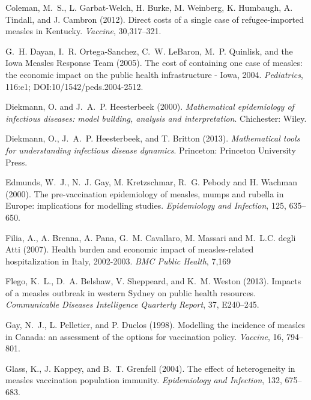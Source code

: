 \documentclass{article}
\begin{document}
\begin{thebibliography}{}
Coleman, M.~S., L. Garbat-Welch, H. Burke, M. Weinberg, K. Humbaugh, A. Tindall, and J. Cambron (2012).
\newblock Direct costs of a single case of refugee-imported measles in Kentucky.
\newblock \emph{Vaccine}, 30,317--321.

G.~H. Dayan, I.~R. Ortega-Sanchez, C.~W. LeBaron, M.~P. Quinlisk, and the Iowa Measles Response Team (2005).
\newblock The cost of containing one case of measles: the economic impact on the public health infrastructure - Iowa, 2004.
\newblock \emph{Pediatrics}, 116:e1; DOI:10/1542/peds.2004-2512.

Diekmann, O. and  J.~A.~P. Heesterbeek (2000).
\newblock \emph{Mathematical epidemiology of infectious diseases: model building, analysis and interpretation}.
Chichester: Wiley.

Diekmann, O.,  J.~A.~P. Heesterbeek, and T. Britton (2013).
\newblock \emph{Mathematical tools for understanding infectious disease dynamics}.
Princeton: Princeton University Press.

Edmunds, W.~J., N.~J. Gay, M. Kretzschmar, R.~G. Pebody and H. Wachman (2000).
\newblock The pre-vaccination epidemiology of measles, mumps and rubella in Europe: implications for modelling studies.
\newblock \emph{Epidemiology and Infection}, 125, 635--650.

Filia, A., A. Brenna, A. Pana, G.~M. Cavallaro, M. Massari and M.~L.C. degli Atti (2007).
\newblock Health burden and economic impact of measles-related hospitalization in Italy, 2002-2003.
\newblock \emph{BMC Public Health}, 7,169

Flego, K.~L., D.~A. Belshaw, V. Sheppeard, and K.~M. Weston (2013).
\newblock Impacts of a measles outbreak in western Sydney on public health resources.
\newblock \emph{Communicable Diseases Intelligence Quarterly Report}, 37, E240--245.

Gay, N.~J., L. Pelletier, and P. Duclos (1998).
\newblock Modelling the incidence of measles in Canada: an assessment of the options for vaccination policy.
\newblock \emph{Vaccine}, 16, 794--801.

Glass, K., J. Kappey, and B.~T. Grenfell (2004).
\newblock The effect of heterogeneity in measles vaccination population immunity.
\newblock \emph{Epidemiology and Infection}, 132, 675--683.


\end{thebibliography}
\end{document}

